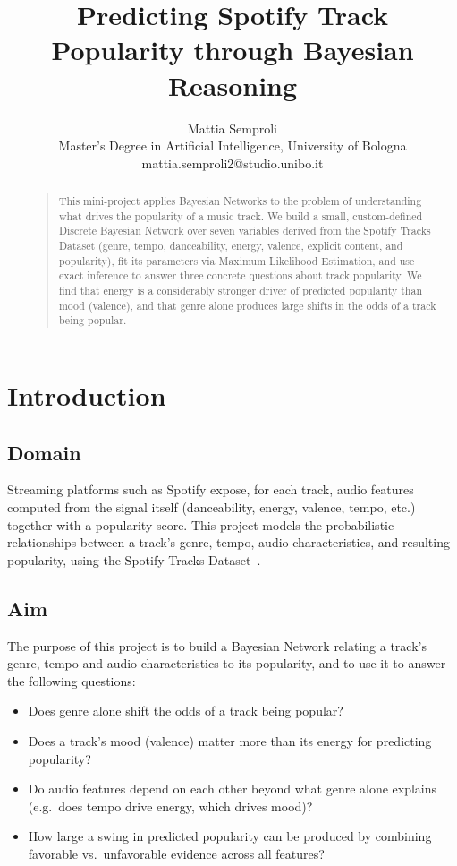 \documentclass[letterpaper]{article}
\begin{document}
\title{Predicting Spotify Track Popularity through Bayesian Reasoning}
\author{Mattia Semproli \\
Master's Degree in Artificial Intelligence, University of Bologna\\
mattia.semproli2@studio.unibo.it
}
\maketitle

\begin{abstract}
\begin{quote}
This mini-project applies Bayesian Networks to the problem of understanding
what drives the popularity of a music track. We build a small, custom-defined
Discrete Bayesian Network over seven variables derived from the Spotify Tracks
Dataset (genre, tempo, danceability, energy, valence, explicit content, and
popularity), fit its parameters via Maximum Likelihood Estimation, and use
exact inference to answer three concrete questions about track popularity.
We find that energy is a considerably stronger driver of predicted
popularity than mood (valence), and that genre alone produces large shifts
in the odds of a track being popular.
\end{quote}
\end{abstract}


\section{Introduction}
\subsection{Domain}
Streaming platforms such as Spotify expose, for each track, audio features
computed from the signal itself (danceability, energy, valence, tempo,
etc.) together with a popularity score. This project models the
probabilistic relationships between a track's genre, tempo, audio
characteristics, and resulting popularity, using the Spotify Tracks
Dataset~\cite{spotify-dataset}.

\subsection{Aim}
The purpose of this project is to build a Bayesian Network relating a
track's genre, tempo and audio characteristics to its popularity, and to
use it to answer the following questions:
\begin{itemize}
    \item Does genre alone shift the odds of a track being popular?
    \item Does a track's mood (valence) matter more than its energy for
    predicting popularity?
    \item Do audio features depend on each other beyond what genre alone
    explains (e.g.\ does tempo drive energy, which drives mood)?
    \item How large a swing in predicted popularity can be produced by
    combining favorable vs.\ unfavorable evidence across all features?
\end{itemize}
\end{document}
